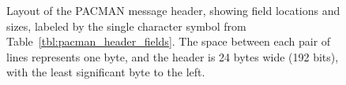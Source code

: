 \documentclass[12pt]{article}
\begin{document}
\begin{figure}[htbp]
  \centering
  \caption{Layout of the PACMAN message header, showing field
    locations and sizes, labeled by the single character symbol from
    Table~\ref{tbl:pacman_header_fields}.  The space between each pair
    of lines represents one byte, and the header is 24 bytes wide
    (192 bits), with the least significant byte to the left.}
\label{fig:pacman_header_layout}
\end{figure}
\end{document}
